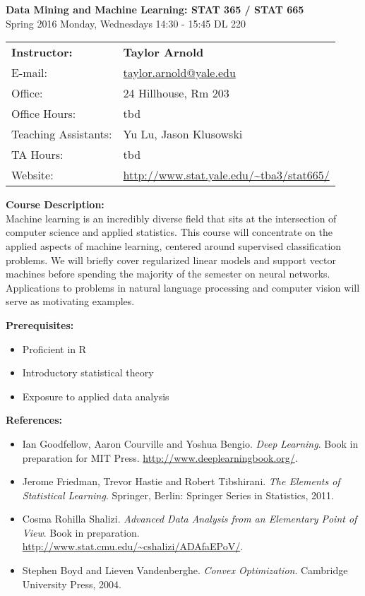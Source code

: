 \documentclass[12pt]{article}
\begin{document}
\begin{center}
{\bf Data Mining and Machine Learning: STAT 365 / STAT 665} \\
Spring 2016 \quad Monday, Wednesdays 14:30 - 15:45 \quad DL 220
\end{center}

\bigskip

\noindent
\begin{tabular}{ l l }
{\bf Instructor:} &  {\bf Taylor Arnold} \\
E-mail: & \href{mailto:taylor.arnold@yale.edu}{taylor.arnold@yale.edu} \\
Office: & 24 Hillhouse, Rm 203 \\
Office Hours: & tbd \\
Teaching Assistants: & Yu Lu, Jason Klusowski \\
TA Hours: & tbd \\
Website: & \url{http://www.stat.yale.edu/~tba3/stat665/}
\end{tabular}

\vspace{0.5cm}

{\bf Course Description:} \\

Machine learning is an incredibly diverse field that sits at
the intersection of computer science and applied statistics.
This course will concentrate on the applied aspects of machine
learning, centered around supervised classification problems.
We will briefly cover regularized linear models and support
vector machines before spending the majority of the semester
on neural networks. Applications to problems in natural
language processing and computer vision will serve as
motivating examples.

\vspace{0.2cm}

{\bf Prerequisites:}
\begin{itemize}\setlength\itemsep{0em}
\item Proficient in R
\item Introductory statistical theory
\item Exposure to applied data analysis
\end{itemize}

\vspace{0.2cm}

{\bf References:}
\begin{itemize}\setlength\itemsep{0em}
\item Ian Goodfellow, Aaron Courville and Yoshua Bengio. \textit{Deep Learning}. Book in preparation for MIT Press. \url{http://www.deeplearningbook.org/}.
\item Jerome Friedman, Trevor Hastie and Robert Tibshirani. \textit{The Elements of Statistical Learning}. Springer, Berlin: Springer Series in Statistics, 2011.
\item Cosma Rohilla Shalizi. \textit{Advanced Data Analysis from an Elementary Point of View}. Book in preparation. \url{http://www.stat.cmu.edu/~cshalizi/ADAfaEPoV/}.
\item Stephen Boyd and Lieven Vandenberghe. \textit{Convex Optimization}. Cambridge University Press, 2004.
\end{itemize}
\end{document}
